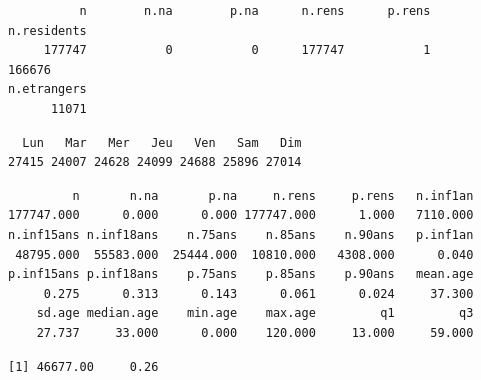 \documentclass[]{article}
\newenvironment{Shaded}{\begin{snugshade}}{\end{snugshade}}
\newcommand{\KeywordTok}[1]{\textcolor[rgb]{0.13,0.29,0.53}{\textbf{{#1}}}}
\newcommand{\StringTok}[1]{\textcolor[rgb]{0.31,0.60,0.02}{{#1}}}
\newcommand{\CommentTok}[1]{\textcolor[rgb]{0.56,0.35,0.01}{\textit{{#1}}}}
\newcommand{\NormalTok}[1]{{#1}}
\begin{document}
\begin{verbatim}
          n        n.na        p.na      n.rens      p.rens n.residents 
     177747           0           0      177747           1      166676 
n.etrangers 
      11071 
\end{verbatim}

\begin{Shaded}
\end{Shaded}

\begin{verbatim}
  Lun   Mar   Mer   Jeu   Ven   Sam   Dim 
27415 24007 24628 24099 24688 25896 27014 
\end{verbatim}

\begin{Shaded}
\end{Shaded}

\begin{verbatim}
         n       n.na       p.na     n.rens     p.rens   n.inf1an 
177747.000      0.000      0.000 177747.000      1.000   7110.000 
n.inf15ans n.inf18ans    n.75ans    n.85ans    n.90ans   p.inf1an 
 48795.000  55583.000  25444.000  10810.000   4308.000      0.040 
p.inf15ans p.inf18ans    p.75ans    p.85ans    p.90ans   mean.age 
     0.275      0.313      0.143      0.061      0.024     37.300 
    sd.age median.age    min.age    max.age         q1         q3 
    27.737     33.000      0.000    120.000     13.000     59.000 
\end{verbatim}

\begin{Shaded}
\end{Shaded}

\begin{verbatim}
[1] 46677.00     0.26
\end{verbatim}

\begin{Shaded}
\end{Shaded}
\end{document}

